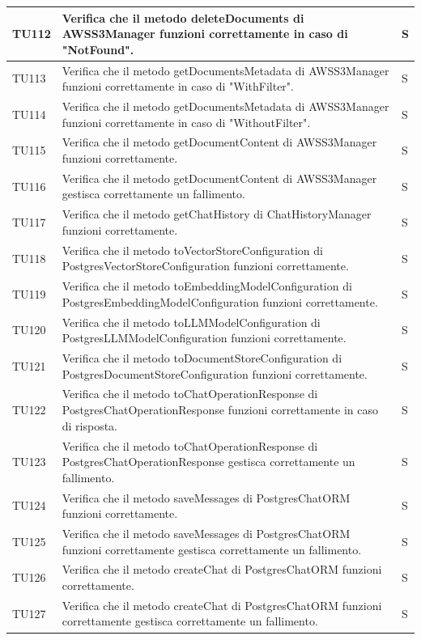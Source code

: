 \documentclass[10pt, a4paper]{article}
\begin{document}
\begin{xltabular}{\textwidth}{p{0.12\textwidth}|p{0.7\textwidth}|X}
\hline
TU112 & Verifica che il metodo deleteDocuments di AWSS3Manager funzioni correttamente in caso di "NotFound". & S \\
\hline
TU113 & Verifica che il metodo getDocumentsMetadata di AWSS3Manager funzioni correttamente in caso di "WithFilter". & S \\
\hline
TU114 & Verifica che il metodo getDocumentsMetadata di AWSS3Manager funzioni correttamente in caso di "WithoutFilter". & S \\
\hline
TU115 & Verifica che il metodo getDocumentContent di AWSS3Manager funzioni correttamente. & S \\
\hline
TU116 & Verifica che il metodo getDocumentContent di AWSS3Manager gestisca correttamente un fallimento. & S \\
\hline
TU117 & Verifica che il metodo getChatHistory di ChatHistoryManager funzioni correttamente. & S \\
\hline
TU118 & Verifica che il metodo toVectorStoreConfiguration di PostgresVectorStoreConfiguration funzioni correttamente. & S \\
\hline
TU119 & Verifica che il metodo toEmbeddingModelConfiguration di PostgresEmbeddingModelConfiguration funzioni correttamente. & S \\
\hline
TU120 & Verifica che il metodo toLLMModelConfiguration di PostgresLLMModelConfiguration funzioni correttamente. & S \\
\hline
TU121 & Verifica che il metodo toDocumentStoreConfiguration di PostgresDocumentStoreConfiguration funzioni correttamente. & S \\
\hline
TU122 & Verifica che il metodo toChatOperationResponse di PostgresChatOperationResponse funzioni correttamente in caso di risposta. & S \\
\hline
TU123 & Verifica che il metodo toChatOperationResponse di PostgresChatOperationResponse gestisca correttamente un fallimento. & S \\
\hline
TU124 & Verifica che il metodo saveMessages di PostgresChatORM funzioni correttamente. & S \\
\hline
TU125 & Verifica che il metodo saveMessages di PostgresChatORM funzioni correttamente gestisca correttamente un fallimento. & S \\
\hline
TU126 & Verifica che il metodo createChat di PostgresChatORM funzioni correttamente. & S \\
\hline
TU127 & Verifica che il metodo createChat di PostgresChatORM funzioni correttamente gestisca correttamente un fallimento. & S \\

\end{xltabular}
\end{document}
